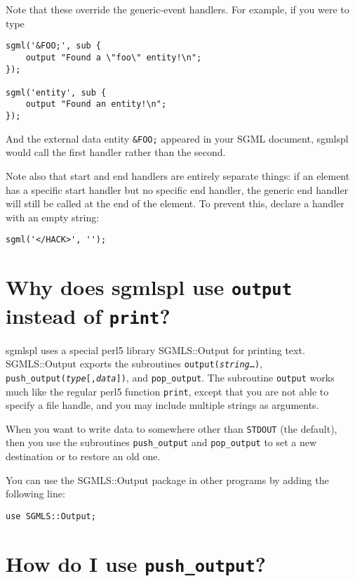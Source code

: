 Note that these override the generic-event handlers.  For example, if you
were to type

{\footnotesize\begin{verbatim}
sgml('&FOO;', sub {
    output "Found a \"foo\" entity!\n";
});

sgml('entity', sub {
    output "Found an entity!\n";
});
\end{verbatim}}

And the external data entity {\tt \&FOO;}
appeared in your {\sc SGML} document, {\sc sgmlspl} would call the first
handler rather than the second.

Note also that start and end handlers are entirely separate
things: if an element has a specific start handler but no specific end
handler, the generic end handler will still be called at the end of
the element.  To prevent this, declare a handler with an empty string:

{\footnotesize\begin{verbatim}
sgml('</HACK>', '');
\end{verbatim}}




\section{Why does {\sc sgmlspl} use {\tt output} instead of
{\tt print}?}
\label{OUTPUT}


{\sc sgmlspl} uses a special {\sc perl5} library {\sc SGMLS::Output} for
printing text.  {\sc SGMLS::Output} exports the subroutines
{\tt output({\tt\sl string\/}{\ldots})},
{\tt push\_output({\tt\sl type\/}[,{\tt\sl data\/}])},
and {\tt pop\_output}.  The subroutine
{\tt output} works much like the regular {\sc perl5} function
{\tt print}, except that you are not able to specify a
file handle, and you may include multiple strings as arguments.

When you want to write data to somewhere other than
{\tt STDOUT} (the default), then you use the subroutines
{\tt push\_output} and
{\tt pop\_output} to set
a new destination or to restore an old one.

You can use the {\sc SGMLS::Output} package in other programs by adding
the following line:

{\footnotesize\begin{verbatim}
use SGMLS::Output;
\end{verbatim}}




\section{How do I use {\tt push\_output}?}
\label{PUSHOUTPUT}


